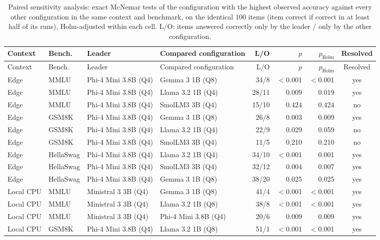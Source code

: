 \begin{longtable}{@{}l l l l r r r c@{}}
\caption{Paired sensitivity analysis: exact McNemar tests of the configuration with the highest observed accuracy against every other configuration in the same context and benchmark, on the identical 100 items (item correct if correct in at least half of its runs), Holm-adjusted within each cell. L/O: items answered correctly only by the leader / only by the other configuration.}\label{tab:s5}\\
\toprule
Context & Bench. & Leader & Compared configuration & L/O & $p$ & $p_{\mathrm{Holm}}$ & Resolved \\
\midrule\endfirsthead
\toprule
Context & Bench. & Leader & Compared configuration & L/O & $p$ & $p_{\mathrm{Holm}}$ & Resolved \\
\midrule\endhead
\bottomrule\endfoot
Edge & MMLU & Phi-4 Mini 3.8B (Q4) & Gemma 3 1B (Q8) & 34/8 & $<$0.001 & $<$0.001 & yes \\
Edge & MMLU & Phi-4 Mini 3.8B (Q4) & Llama 3.2 1B (Q4) & 28/11 & 0.009 & 0.019 & yes \\
Edge & MMLU & Phi-4 Mini 3.8B (Q4) & SmolLM3 3B (Q4) & 15/10 & 0.424 & 0.424 & no \\
\midrule
Edge & GSM8K & Phi-4 Mini 3.8B (Q4) & Gemma 3 1B (Q8) & 26/8 & 0.003 & 0.009 & yes \\
Edge & GSM8K & Phi-4 Mini 3.8B (Q4) & Llama 3.2 1B (Q4) & 22/9 & 0.029 & 0.059 & no \\
Edge & GSM8K & Phi-4 Mini 3.8B (Q4) & SmolLM3 3B (Q4) & 11/5 & 0.210 & 0.210 & no \\
\midrule
Edge & HellaSwag & Phi-4 Mini 3.8B (Q4) & Llama 3.2 1B (Q4) & 34/10 & $<$0.001 & 0.001 & yes \\
Edge & HellaSwag & Phi-4 Mini 3.8B (Q4) & SmolLM3 3B (Q4) & 32/12 & 0.004 & 0.007 & yes \\
Edge & HellaSwag & Phi-4 Mini 3.8B (Q4) & Gemma 3 1B (Q8) & 38/20 & 0.025 & 0.025 & yes \\
\midrule
Local CPU & MMLU & Ministral 3 3B (Q4) & Gemma 3 1B (Q8) & 41/4 & $<$0.001 & $<$0.001 & yes \\
Local CPU & MMLU & Ministral 3 3B (Q4) & Llama 3.2 1B (Q8) & 38/8 & $<$0.001 & $<$0.001 & yes \\
Local CPU & MMLU & Ministral 3 3B (Q4) & Phi-4 Mini 3.8B (Q4) & 20/6 & 0.009 & 0.009 & yes \\
\midrule
Local CPU & GSM8K & Phi-4 Mini 3.8B (Q4) & Llama 3.2 1B (Q8) & 51/1 & $<$0.001 & $<$0.001 & yes \\

\end{longtable}
